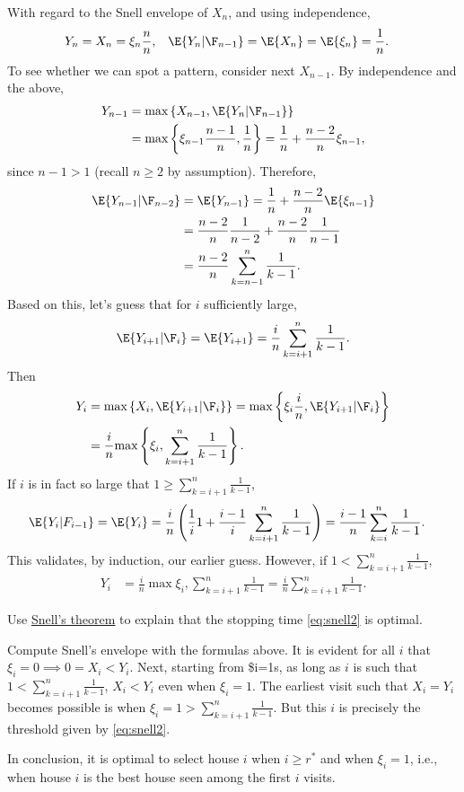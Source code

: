 \documentclass[a4paper]{article}
\begin{document}
With regard to the Snell envelope of \(X_n\), and using independence,
\begin{align*}
Y_n &=  X_n = \xi_n \frac{n}{n}, & \E{Y_n | \F_{n-1}} &= \E{X_{n}} = \E{\xi_{n}} = \frac{1}{n}.
\end{align*}
To see whether we can spot a pattern, consider next \(X_{n-1}\). By independence and the above,
\begin{align*}
Y_{n-1} &= \max{X_{n-1}, \E{Y_{n}|\F_{n-1}}} \\
&= \max{\xi_{n-1}\frac{n-1}{n}, \frac{1}{n}} = \frac{1}{n} + \frac{n-2}{n} \xi_{n-1},
\end{align*}
since \(n-1 > 1\) (recall \(n\geq 2\) by assumption).
Therefore,
\begin{align*}
\E{Y_{n-1}|\F_{n-2}} &= \E{Y_{n-1}} = \frac{1}{n} + \frac{n-2}{n}\E{\xi_{n-1}} \\
&=\frac{n-2}{n}\frac{1}{n-2} + \frac{n-2}{n} \frac{1}{n-1} \\
&= \frac{n-2}{n} \sum_{k=n-1}^n \frac{1}{k-1}.
\end{align*}
Based on this, let's guess that for \(i\) sufficiently large,
\begin{align*}
\E{Y_{i+1}|\F_{i}} = \E{Y_{i+1}}
= \frac{i}{n} \sum_{k=i+1}^n \frac{1}{k-1}.
\end{align*}
Then
\begin{align*}
Y_{i}
&= \max{X_{i}, \E{Y_{i+1}|\F_{i}}}
= \max{\xi_i \frac{i}{n}, \E{Y_{i+1}|\F_{i}}} \\
&= \frac{i}{n}\max{\xi_i , \sum_{k=i+1}^n \frac{1}{k-1}}.
\end{align*}
If \(i\) is in fact so large that \(1 \geq \sum_{k=i+1}^{n} \frac{1}{k-1}\),
\begin{align*}
\E{Y_{i}|F_{i-1}} &=  \E{Y_{i}}
= \frac{i}{n}\left(\frac{1}{i} 1   +  \frac{i-1}{i}\sum_{k=i+1}^n \frac{1}{k-1}\right)
= \frac{i-1}{n} \sum_{k=i}^n \frac{1}{k-1}.
\end{align*}
This validates, by induction, our earlier guess. However, if \(1 < \sum_{k=i+1}^{n} \frac{1}{k-1}\),
\begin{align*}
Y_{i} &= \frac{i}{n}\max{\xi_i , \sum_{k=i+1}^n \frac{1}{k-1}} = \frac{i}{n}\sum_{k=i+1}^n \frac{1}{k-1}.
\end{align*}


\begin{exercise}
Use \hyperref[th:snell]{Snell's theorem} to explain that the stopping time \cref{eq:snell2} is optimal.
\begin{solution}
Compute Snell's envelope with the formulas above.
It is evident for all \(i\) that \(\xi_i = 0 \implies 0 = X_{i} < Y_i\).
Next, starting from \$i=1s, as long as \(i\) is such that \(1 < \sum_{k=i+1}^{n} \frac{1}{k-1}\), \(X_{i} < Y_i\) even when \(\xi_i = 1\).
The earliest visit such that \(X_i = Y_i\) becomes possible is when \(\xi_i=1 > \sum_{k=i+1}^{n} \frac{1}{k-1}\). But this \(i\) is precisely the threshold given by
\cref{eq:snell2}.
\end{solution}
\end{exercise}

In conclusion, it is optimal to select house \(i\) when \(i\geq r^{*}\) and when \(\xi_{i} = 1\), i.e., when house \(i\) is the best house seen among the first \(i\) visits.
\end{document}

